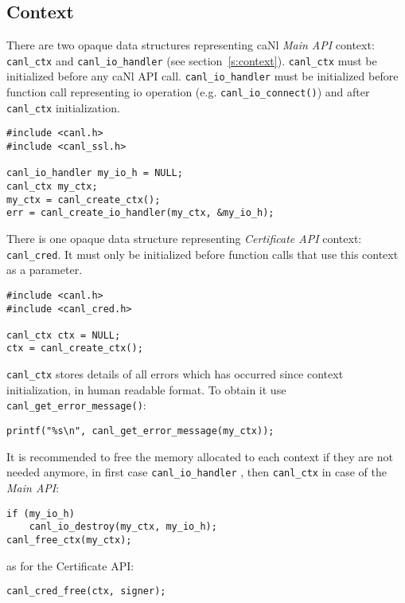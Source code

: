 \subsection{Context}
\label{s:canl_ctx}
%
There are two opaque data structures representing 
caNl \textit{Main API} context: {\tt canl\_ctx} and
 {\tt canl\_io\_handler} (see section~\ref{s:context}).
{\tt canl\_ctx} must be initialized before any caNl API call.
{\tt canl\_io\_handler} must be initialized before function call 
representing io operation (e.g. \verb'canl_io_connect()') and after
{\tt canl\_ctx} initialization. 
\begin{lstlisting}
#include <canl.h>
#include <canl_ssl.h>

canl_io_handler my_io_h = NULL;
canl_ctx my_ctx;
my_ctx = canl_create_ctx();
err = canl_create_io_handler(my_ctx, &my_io_h);
\end{lstlisting}
There is one opaque data structure representing \CANL 
\textit{Certificate API} context: {\tt canl\_cred}.
It must only be initialized before function calls
that use this context as a parameter.
\begin{lstlisting}
#include <canl.h>
#include <canl_cred.h>

canl_ctx ctx = NULL;
ctx = canl_create_ctx();
\end{lstlisting}
%
{\tt canl\_ctx} stores details of all errors which has occurred since 
context initialization, in human readable format. To obtain it use 
\verb'canl_get_error_message()':
\begin{lstlisting}
printf("%s\n", canl_get_error_message(my_ctx));
\end{lstlisting}

%
It is recommended to free the memory allocated to each 
context if they are not needed anymore, in first case {\tt canl\_io\_handler}
, then {\tt canl\_ctx} in case of the \textit{Main API}:
\begin{lstlisting}
if (my_io_h)
	canl_io_destroy(my_ctx, my_io_h);
canl_free_ctx(my_ctx);
\end{lstlisting}
as for the Certificate API:
\begin{lstlisting}
canl_cred_free(ctx, signer);
\end{lstlisting}
